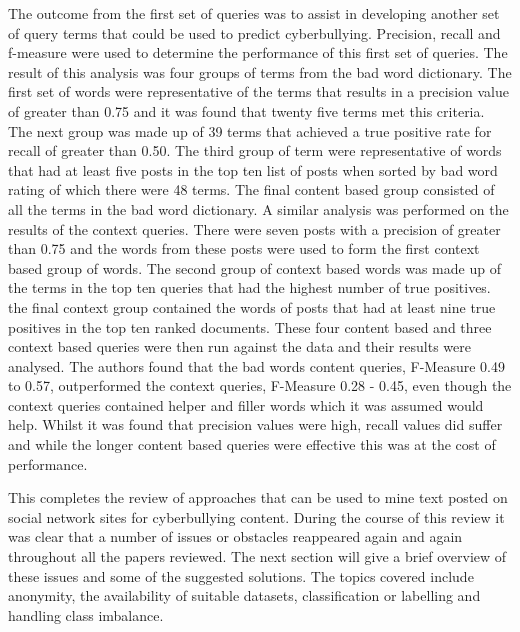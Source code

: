 The outcome from the first set of queries was to assist in developing another set of query terms that could be used to predict cyberbullying. Precision, recall and f-measure were used to determine the performance of this first set of queries. The result of this analysis was four groups of terms from the bad word dictionary. The first set of words were representative of the terms that results in a precision value of greater than 0.75 and it was found that twenty five terms met this criteria. The next group was made up of 39 terms that achieved a true positive rate for recall of greater than 0.50. The third group of term were representative of words that had at least five posts in the top ten list of posts when sorted by bad word rating of which there were 48 terms. The final content based group consisted of all the terms in the bad word dictionary. A similar analysis was performed on the results of the context queries. There were seven posts with a precision of greater than 0.75 and the words from these posts were used to form the first context based group of words. The second group of context based words was made up of the terms in the top ten queries that had the highest number of true positives. the final context group contained the words of posts that had at least nine true positives in the top ten ranked documents. These four content based and three context based queries were then run against the data and their results were analysed. The authors found that the bad words content queries, F-Measure 0.49 to 0.57, outperformed the context queries, F-Measure 0.28 - 0.45, even though the context queries contained helper and filler words which it was assumed would help. Whilst it was found that precision values were high, recall values did suffer and while the longer content based queries were effective this was at the cost of performance.

This completes the review of approaches that can be used to mine text posted on social network sites for cyberbullying content. During the course of this review it was clear that a number of issues or obstacles reappeared again and again throughout all the papers reviewed. The next section will give a brief overview of these issues and some of the suggested solutions. The topics covered include anonymity, the availability of suitable datasets, classification or labelling and handling class imbalance.
